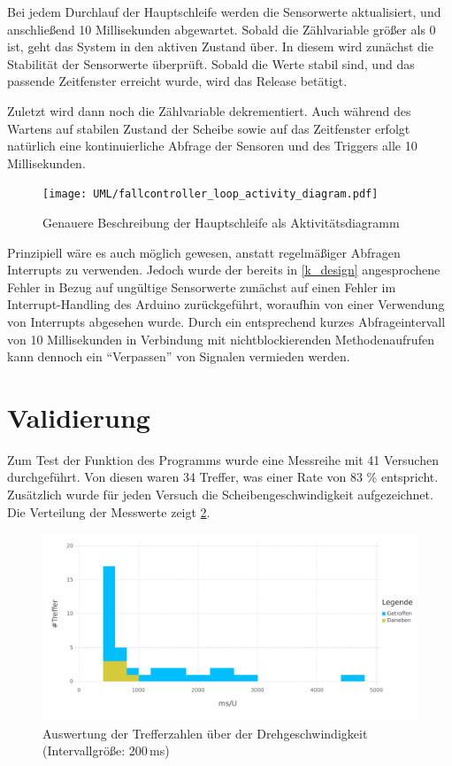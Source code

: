 Bei jedem Durchlauf der Hauptschleife werden die Sensorwerte aktualisiert, und anschließend 10 Millisekunden abgewartet.
Sobald die Zählvariable größer als 0 ist, geht das System in den aktiven Zustand über.
In diesem wird zunächst die Stabilität der Sensorwerte überprüft.
Sobald die Werte stabil sind, und das passende Zeitfenster erreicht wurde, wird das Release betätigt.

Zuletzt wird dann noch die Zählvariable dekrementiert.
Auch während des Wartens auf stabilen Zustand der Scheibe sowie auf das Zeitfenster erfolgt natürlich eine kontinuierliche Abfrage der Sensoren und des Triggers alle 10 Millisekunden.

\begin{figure}[htb!] \centering
	\texttt{[image: UML/fallcontroller\_loop\_activity\_diagram.pdf]}
	\caption{Genauere Beschreibung der Hauptschleife als Aktivitätsdiagramm}
	\label{uml:activity_diagram}
\end{figure}

Prinzipiell wäre es auch möglich gewesen, anstatt regelmäßiger Abfragen Interrupts zu verwenden.
Jedoch wurde der bereits in \cref{k_design} angesprochene Fehler in Bezug auf ungültige Sensorwerte zunächst auf einen Fehler im Interrupt-Handling des Arduino zurückgeführt, woraufhin von einer Verwendung von Interrupts abgesehen wurde.
Durch ein entsprechend kurzes Abfrageintervall von 10 Millisekunden in Verbindung mit nichtblockierenden Methodenaufrufen kann dennoch ein \enquote{Verpassen} von Signalen vermieden werden.

\section{Validierung}
Zum Test der Funktion des Programms wurde eine Messreihe mit 41 Versuchen durchgeführt.
Von diesen waren 34 Treffer, was einer Rate von 83 \% entspricht.
Zusätzlich wurde für jeden Versuch die Scheibengeschwindigkeit aufgezeichnet.
Die Verteilung der Messwerte zeigt \cref{img:auswertungsplot}.

\begin{figure}[htb!] \centering
	\includegraphics[width=\textwidth]{images/auswertung.pdf}
	\caption{Auswertung der Trefferzahlen über der Drehgeschwindigkeit (Intervallgröße: 200\,ms)}
	\label{img:auswertungsplot}
\end{figure}

